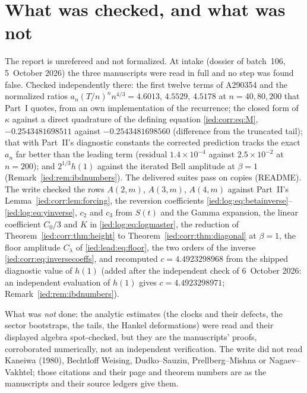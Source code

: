 \documentclass[11pt,letterpaper]{article}
\theoremstyle{remark}\newtheorem{remark}[theorem]{Remark}
\begin{document}
\section*{What was checked, and what was not}\label{ied:sec:trust}
The report is unrefereed and not formalized. At intake (dossier of batch~106, 5~October 2026) the three manuscripts were read in full and no step was found false. Checked independently there: the first twelve terms of A290354 and the normalized ratios $a_n(T/n)^nn^{4/3}=4.6013$, $4.5529$, $4.5178$ at $n=40,80,200$ that Part~I quotes, from an own implementation of the recurrence; the closed form of $\kappa$ against a direct quadrature of the defining equation \eqref{ied:corr:eq:M}, $-0.2543481698511$ against $-0.2543481698560$ (difference from the truncated tail); that with Part~II's diagnostic constants the corrected prediction tracks the exact $a_n$ far better than the leading term (residual $1.4\times10^{-4}$ against $2.5\times10^{-2}$ at $n=200$); and $2^{1/3}h(1)$ against the iterated Bell amplitude at $\beta=1$ (Remark~\ref{ied:rem:ibdnumbers}). The delivered suites pass on copies (README). The write checked the rows $A(2,m)$, $A(3,m)$, $A(4,m)$ against Part~II's Lemma~\ref{ied:corr:lem:forcing}, the reversion coefficients \eqref{ied:log:eq:betainverse}--\eqref{ied:log:eq:yinverse}, $c_2$ and $c_3$ from $S(t)$ and the Gamma expansion, the linear coefficient $C_0/3$ and $K$ in \eqref{ied:log:eq:logmaster}, the reduction of Theorem~\ref{ied:corr:thm:height} to Theorem~\ref{ied:corr:thm:diagonal} at $\beta=1$, the floor amplitude $C_\lambda$ of \eqref{ied:lead:eq:floor}, the two orders of the inverse \eqref{ied:corr:eq:inversecoeffs}, and recomputed $c=4.4923298968$ from the shipped diagnostic value of $h(1)$ \textup{(added after the independent check of 6~October 2026: an independent evaluation of $h(1)$ gives $c=4.4923298971$; Remark~\ref{ied:rem:ibdnumbers})}.

What was \emph{not} done: the analytic estimates (the clocks and their defects, the sector bootstraps, the tails, the Hankel deformations) were read and their displayed algebra spot-checked, but they are the manuscripts' proofs, corroborated numerically, not an independent verification. The write did not read Kaneiwa (1980), Bechtloff Weising, Dudko--Sauzin, Prellberg--Mishna or Nagaev--Vakhtel; those citations and their page and theorem numbers are as the manuscripts and their source ledgers give them.
\end{document}
